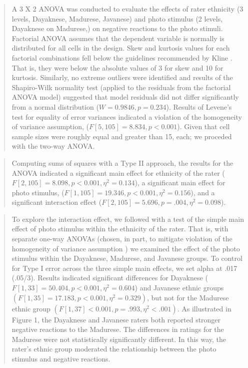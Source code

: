 \documentclass[
  11pt,
]{book}
\begin{document}
\begin{quote}
A 3 X 2 ANOVA was conducted to evaluate the effects of rater ethnicity (3 levels, Dayaknese, Madurese, Javanese) and photo stimulus (2 levels, Dayaknese on Madurese,) on negative reactions to the photo stimuli. Factorial ANOVA assumes that the dependent variable is normally is distributed for all cells in the design. Skew and kurtosis values for each factorial combinations fell below the guidelines recommended by Kline \citeyearpar{kline_data_2016}. That is, they were below the absolute values of 3 for skew and 10 for kurtosis. Similarly, no extreme outliers were identified and results of the Shapiro-Wilk normality test (applied to the residuals from the factorial ANOVA model) suggested that model residuals did not differ significantly from a normal distribution (\(W = 0.9846, p = 0.234\)). Results of Levene's test for equality of error variances indicated a violation of the homogeneity of variance assumption, (\(F[5, 105] = 8.834, p < 0.001\)). Given that cell sample sizes were roughly equal and greater than 15, each; \citep{green_using_2017} we proceded with the two-way ANOVA.
\end{quote}

\begin{quote}
Computing sums of squares with a Type II approach, the results for the ANOVA indicated a significant main effect for ethnicity of the rater (\(F[2, 105] = 8.098, p < 0.001, \eta ^{2} = 0.134\)), a significant main effect for photo stimulus, (\(F[1, 105] = 19.346, p < 0.001, \eta ^{2} = 0.156\)), and a significant interaction effect (\(F[2, 105] = 5.696, p = .004, \eta ^{2} = 0.098\)).
\end{quote}

\begin{quote}
To explore the interaction effect, we followed with a test of the simple main effect of photo stimulus within the ethnicity of the rater. That is, with separate one-way ANOVAs (chosen, in part, to mitigate violation of the homogeneity of variance assumption \citep{kassambara_anova_nodate}) we examined the effect of the photo stimulus within the Dayaknese, Madurese, and Javanese groups. To control for Type I error across the three simple main effects, we set alpha at .017 (.05/3). Results indicated significant differences for Dayaknese (\(F [1, 33] = 50.404, p < 0.001, \eta ^{2} = 0.604\)) and Javanese ethnic groups \((F [1, 35] = 17.183, p < 0.001, \eta ^{2} = 0.329)\), but not for the Madurese ethnic group \((F [1, 37] < 0.001, p = .993, \eta ^{2} < .001)\). As illustrated in Figure 1, the Dayaknese and Javanese raters both reported stronger negative reactions to the Madurese. The differences in ratings for the Madurese were not statistically significantly different. In this way, the rater's ethnic group moderated the relationship between the photo stimulus and negative reactions.
\end{quote}
\end{document}
